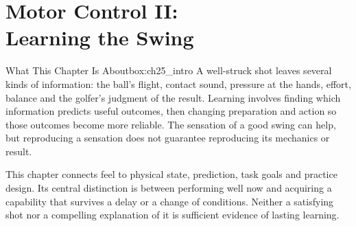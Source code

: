 \chapter[Motor Control II: Learning the Swing]{Motor Control II:\\Learning the Swing}
\label{ch:motor_learning}
\raggedbottom
{}

\begin{laymansbox}{What This Chapter Is About}{box:ch25_intro}
A well-struck shot leaves several kinds of information: the ball's flight, contact sound, pressure at the hands, effort, balance and the golfer's judgment of the result. Learning involves finding which information predicts useful outcomes, then changing preparation and action so those outcomes become more reliable. The sensation of a good swing can help, but reproducing a sensation does not guarantee reproducing its mechanics or result.

This chapter connects feel to physical state, prediction, task goals and practice design. Its central distinction is between performing well now and acquiring a capability that survives a delay or a change of conditions. Neither a satisfying shot nor a compelling explanation of it is sufficient evidence of lasting learning.
\end{laymansbox}

